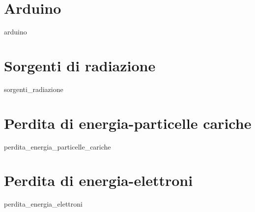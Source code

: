 \documentclass[openany,12pt]{book}
\begin{document}
\chapter{Arduino}
{arduino}

\chapter{Sorgenti di radiazione}
{sorgenti_radiazione}

\chapter{Perdita di energia-particelle cariche}
{perdita_energia_particelle_cariche}

\chapter{Perdita di energia-elettroni}
{perdita_energia_elettroni}

\end{document}
